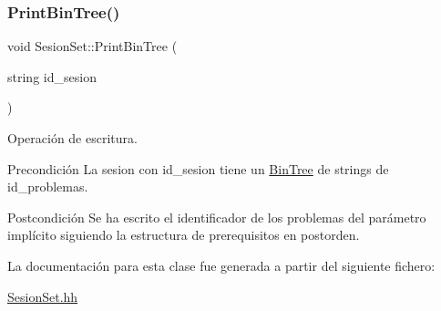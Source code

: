 \subsubsection{\texorpdfstring{Print\+Bin\+Tree()}{PrintBinTree()}}
{\footnotesize\ttfamily void Sesion\+Set\+::\+Print\+Bin\+Tree (\begin{DoxyParamCaption}\item[{string}]{id\+\_\+sesion }\end{DoxyParamCaption})}



Operación de escritura. 

\begin{DoxyPrecond}{Precondición}
La sesion con id\+\_\+sesion tiene un \mbox{\hyperlink{class_bin_tree}{Bin\+Tree}} de strings de id\+\_\+problemas. 
\end{DoxyPrecond}
\begin{DoxyPostcond}{Postcondición}
Se ha escrito el identificador de los problemas del parámetro implícito siguiendo la estructura de prerequisitos en postorden. 
\end{DoxyPostcond}


La documentación para esta clase fue generada a partir del siguiente fichero\+:\begin{DoxyCompactItemize}
\item 
\mbox{\hyperlink{_sesion_set_8hh}{Sesion\+Set.\+hh}}\end{DoxyCompactItemize}
